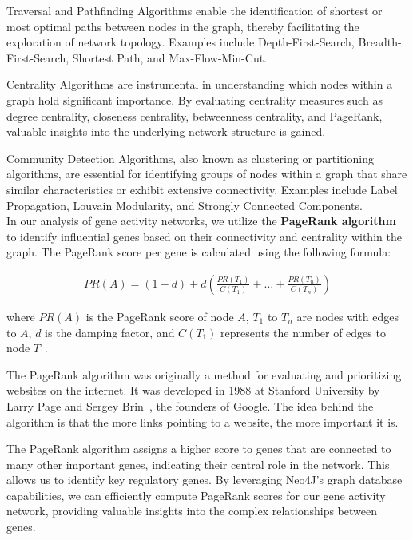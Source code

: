 Traversal and Pathfinding Algorithms enable the identification of shortest or
most optimal paths between nodes in the graph, thereby facilitating the exploration of network topology.
Examples include Depth-First-Search, Breadth-First-Search, Shortest Path, and Max-Flow-Min-Cut.

Centrality Algorithms are instrumental in understanding which nodes within a graph hold significant importance.
By evaluating centrality measures such as degree centrality, closeness centrality, betweenness centrality,
and PageRank, valuable insights into the underlying network structure is gained.

Community Detection Algorithms, also known as clustering or partitioning algorithms,
are essential for identifying groups of nodes within a graph that share similar characteristics
or exhibit extensive connectivity.
Examples include Label Propagation, Louvain Modularity, and Strongly Connected Components.
\cite{neo4j_graph_algorithms}\\


In our analysis of gene activity networks,
we utilize the \textbf{PageRank algorithm} to identify influential genes based on their connectivity and
centrality within the graph.
The PageRank score per gene is calculated using the following formula:

\begin{align*}
PR(A)=(1-d)+d(\frac{PR(T_1)}{C(T_1)}+\dots+\frac{PR(T_n)}{C(T_n)})
\end{align*}

where $PR(A)$ is the PageRank score of node $A$,
$T_1$ to $T_n$ are nodes with edges to $A$,
$d$ is the damping factor,
and $C(T_1)$ represents the number of edges to node $T_1$.

The PageRank algorithm was originally a method for evaluating and prioritizing websites on the internet.
It was developed in 1988 at Stanford University by Larry Page and Sergey Brin~\cite{page1999pagerank},
the founders of Google.
The idea behind the algorithm is that the more links pointing to a website, the more important it is.

The PageRank algorithm assigns a higher score to genes that are connected to many other important genes,
indicating their central role in the network.
This allows us to identify key regulatory genes.
By leveraging Neo4J's graph database capabilities,
we can efficiently compute PageRank scores for our gene activity network,
providing valuable insights into the complex relationships between genes.
